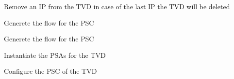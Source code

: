 \documentclass[letterpaper,10pt,oneside]{sphinxmanual}
\begin{document}
\begin{fulllineitems}
\begin{fulllineitems}
\end{fulllineitems}


\begin{fulllineitems}
\label{userTVDIPSECLess:userTVDIPSECLess.UserTVD.deleteTVD}
Remove an IP from the TVD in case of the last IP the TVD will be deleted

\end{fulllineitems}


\begin{fulllineitems}
\label{userTVDIPSECLess:userTVDIPSECLess.UserTVD.generatePSCflows}
Generete the flow for the PSC

\end{fulllineitems}


\begin{fulllineitems}
\label{userTVDIPSECLess:userTVDIPSECLess.UserTVD.generateUserPSCflows}
Generete the flow for the PSC

\end{fulllineitems}


\begin{fulllineitems}
\label{userTVDIPSECLess:userTVDIPSECLess.UserTVD.instantiatePSA}
Instantiate the PSAs for the TVD

\end{fulllineitems}


\begin{fulllineitems}
\label{userTVDIPSECLess:userTVDIPSECLess.UserTVD.setPSC}
Configure the PSC of the TVD

\end{fulllineitems}


\end{fulllineitems}
\end{document}
